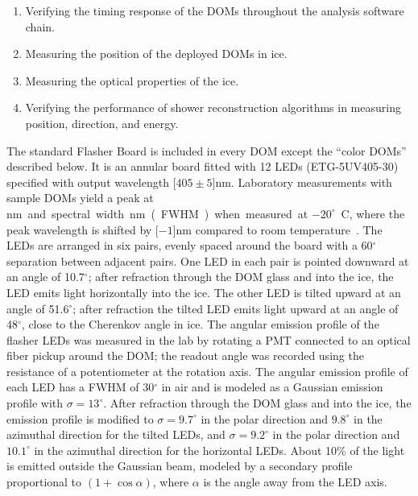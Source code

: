 \begin{enumerate}
\item Verifying the timing response of the DOMs throughout the analysis
  software chain.
\item Measuring the position of the deployed DOMs in ice.
\item Measuring the optical properties of the ice.
\item Verifying the performance of shower reconstruction algorithms
  in measuring position, direction, and energy.
\end{enumerate}

The standard Flasher Board is
included in every DOM except the ``color DOMs''
described below. It is an annular board fitted with 12 LEDs (ETG-5UV405-30)
specified with output wavelength \unit[$405\pm5$]nm.  Laboratory
measurements with sample DOMs yield a peak at
\unit[399]nm and spectral width \unit[14]nm (FWHM) when measured at
$-20^{\circ}$~C, where the peak wavelength is shifted by 
\unit[$-1$]nm compared to room temperature~\cite{Aartsen:2013rt}.
The LEDs are arranged in six pairs, evenly spaced around the board
with a 60$^{\circ}$ separation between adjacent pairs. One LED in each pair
is pointed downward at an angle of 10.7$^{\circ}$; after refraction through the DOM glass and into
the ice, the LED
emits light horizontally into the ice. The other LED is tilted upward
at an angle of 51.6$^{\circ}$; after refraction the tilted LED
emits light upward at an angle 
of 48$^{\circ}$, close to the Cherenkov angle in ice. The angular
emission profile of the flasher LEDs was measured in the lab by
rotating a PMT connected to an
optical fiber pickup around the DOM; the readout angle was recorded
using the resistance of a potentiometer at the rotation axis.
The angular emission profile of each LED has a FWHM of
30$^{\circ}$ in air and is modeled as a Gaussian emission profile
with $\sigma = 13^{\circ}$. After refraction through the DOM glass and into
the ice, the emission profile is modified to $\sigma = 9.7^{\circ}$ in the polar direction
and $9.8^{\circ}$ in the azimuthal direction for the tilted LEDs, and $\sigma=9.2^{\circ}$ in the polar direction
and $10.1^{\circ}$ in the azimuthal direction for the horizontal LEDs.
About 10\% of the light is emitted outside the Gaussian beam, modeled by
a secondary profile proportional to $(1+\cos{\alpha})$, where $\alpha$ is the angle
away from the LED axis.

